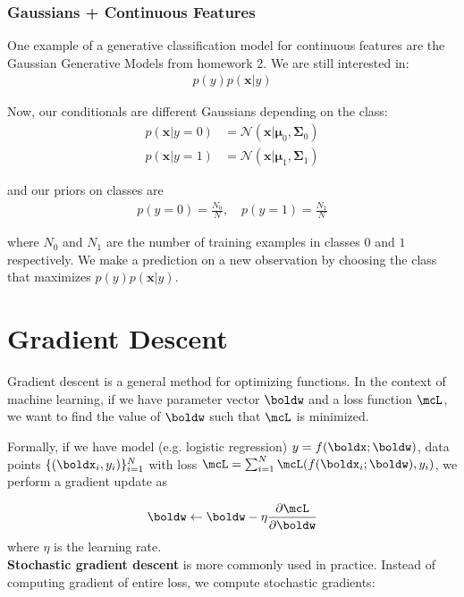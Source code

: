\documentclass[12pt,letterpaper]{article}
\newcommand{\1}{\mathbbm{1}}
\begin{document}
\subsubsection{Gaussians + Continuous Features}

One example of a generative classification model for continuous features are the Gaussian Generative Models from homework 2. We are still interested in:
\begin{align}
     p(y)p(\mathbf{x}|y)
\end{align}

Now, our conditionals are different Gaussians depending on the class:
\begin{align}
    p(\mathbf{x}|y = 0) &= \mathcal{N}(\mathbf{x}|\boldsymbol{\mu}_0,\boldsymbol{\Sigma}_0) \\
p(\mathbf{x}|y = 1) &= \mathcal{N}(\mathbf{x}|\boldsymbol{\mu}_1,\boldsymbol{\Sigma}_1)
\end{align}

and our priors on classes are
\begin{align}
    p(y = 0) = \frac{N_0}{N}, \quad p(y = 1) = \frac{N_1}{N} 
\end{align}

\noindent
where $N_0$ and $N_1$ are the number of training examples in classes $0$ and $1$ respectively. We make a prediction on a new observation by choosing the class that maximizes $p(y)p(\mathbf{x}|y)$.



\section{Gradient Descent}

Gradient descent is a general method for optimizing functions. In the context of machine learning, if we have parameter vector $\boldw$ and a loss function $\mcL$, we want to find the value of $\boldw$ such that $\mcL$ is minimized.

Formally, if we have model (e.g. logistic regression) $y = f(\boldx; \boldw)$, data points $\{(\boldx_i, y_i)\}_{i=1}^N$ with loss $\mcL = \sum_{i=1}^N \mcL(f(\boldx_i; \boldw), y_i)$, we perform a gradient update as

\begin{align}
   \boldw \gets \boldw - \eta \frac{\partial \mcL}{\partial \boldw} 
\end{align}
where $\eta$ is the learning rate.\\

\noindent
\textbf{Stochastic gradient descent} is more commonly used in practice. Instead of computing gradient of entire loss, we compute
  stochastic gradients:
\end{document}
